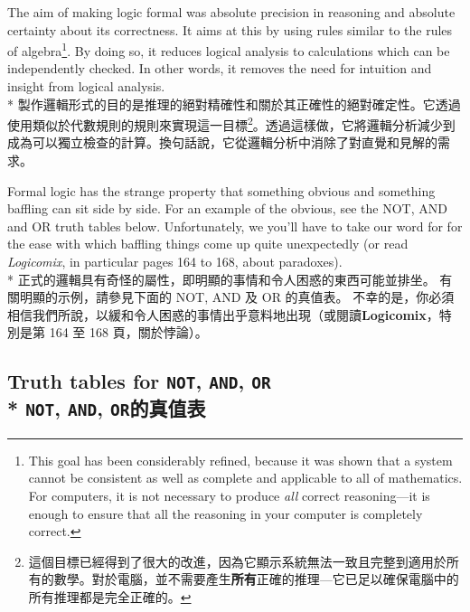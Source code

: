 \documentclass[]{article}
\begin{document}
{\color{gray}The aim of making logic formal was absolute precision in reasoning and absolute certainty about its correctness. It aims at this by using rules similar to the rules of algebra\footnote{{\color{gray}This goal has been considerably refined, because it was shown that a system cannot be consistent as well as complete and applicable to all of mathematics. For computers, it is not necessary to produce \emph{all} correct reasoning---it is enough to ensure that all the reasoning in your computer is completely correct.}}. By doing so, it reduces logical analysis to calculations which can be independently checked. In other words, it removes the need for intuition and insight from logical analysis.}
\\*
{製作邏輯形式的目的是推理的絕對精確性和關於其正確性的絕對確定性。它透過使用類似於代數規則的規則來實現這一目標\footnote{這個目標已經得到了很大的改進，因為它顯示系統無法一致且完整到適用於所有的數學。對於電腦，並不需要產生{\bfseries{所有}}正確的推理---它已足以確保電腦中的所有推理都是完全正確的。}。透過這樣做，它將邏輯分析減少到成為可以獨立檢查的計算。換句話說，它從邏輯分析中消除了對直覺和見解的需求。}

{\color{gray}Formal logic has the strange property that something obvious and something  baffling can sit side by side. For an example of the obvious, see the NOT, AND and OR truth tables below. Unfortunately, we you'll have to take our word {\color{cyan}for for} the ease with which baffling things come up quite unexpectedly (or read \emph{Logicomix}, in particular pages 164 to 168, about paradoxes).}
\\*
{正式的邏輯具有奇怪的屬性，即明顯的事情和令人困惑的東西可能並排坐。 有關明顯的示例，請參見下面的 NOT, AND 及 OR 的真值表。 不幸的是，你必須相信我們所說，以緩和令人困惑的事情出乎意料地出現（或閱讀{\bfseries{Logicomix}}，特別是第 164 至 168 頁，關於悖論）。}

\subsection*{{\color{gray}Truth tables for  {\tt NOT}, {\tt AND}, {\tt OR}}
\\*
{{\tt NOT}, {\tt AND}, {\tt OR}的真值表}
}
\end{document}

